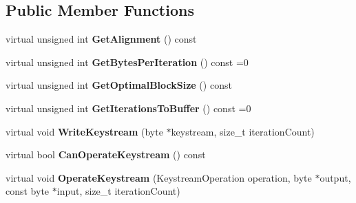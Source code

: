 \subsection*{Public Member Functions}
\begin{DoxyCompactItemize}
\item 
\hypertarget{struct_additive_cipher_abstract_policy_acda807cffcd607d0c676d70aa7e1c6a8}{
virtual unsigned int {\bfseries GetAlignment} () const }
\label{struct_additive_cipher_abstract_policy_acda807cffcd607d0c676d70aa7e1c6a8}

\item 
\hypertarget{struct_additive_cipher_abstract_policy_a573f7abcf5929be546bddc32139bf370}{
virtual unsigned int {\bfseries GetBytesPerIteration} () const =0}
\label{struct_additive_cipher_abstract_policy_a573f7abcf5929be546bddc32139bf370}

\item 
\hypertarget{struct_additive_cipher_abstract_policy_a79a5290262325372d5133797086afd28}{
virtual unsigned int {\bfseries GetOptimalBlockSize} () const }
\label{struct_additive_cipher_abstract_policy_a79a5290262325372d5133797086afd28}

\item 
\hypertarget{struct_additive_cipher_abstract_policy_aa2267beddbc4140e92c78206a24ead0c}{
virtual unsigned int {\bfseries GetIterationsToBuffer} () const =0}
\label{struct_additive_cipher_abstract_policy_aa2267beddbc4140e92c78206a24ead0c}

\item 
\hypertarget{struct_additive_cipher_abstract_policy_aea8268ee42cbc98cf9be638bf77aafef}{
virtual void {\bfseries WriteKeystream} (byte $\ast$keystream, size\_\-t iterationCount)}
\label{struct_additive_cipher_abstract_policy_aea8268ee42cbc98cf9be638bf77aafef}

\item 
\hypertarget{struct_additive_cipher_abstract_policy_a04a2b0cebd5633dd4297d9a8000ac971}{
virtual bool {\bfseries CanOperateKeystream} () const }
\label{struct_additive_cipher_abstract_policy_a04a2b0cebd5633dd4297d9a8000ac971}

\item 
\hypertarget{struct_additive_cipher_abstract_policy_ae948f2e69229ba39837e498a464606d4}{
virtual void {\bfseries OperateKeystream} (KeystreamOperation operation, byte $\ast$output, const byte $\ast$input, size\_\-t iterationCount)}
\label{struct_additive_cipher_abstract_policy_ae948f2e69229ba39837e498a464606d4}


\end{DoxyCompactItemize}
